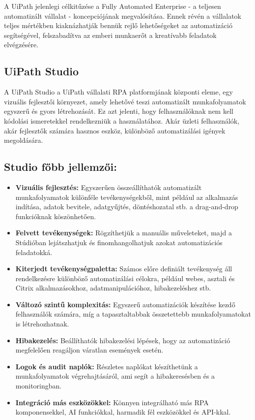 \documentclass[
]{thesis-ekf}
\theoremstyle{definition}
\theoremstyle{remark}
\begin{document}
A UiPath jelenlegi célkitűzése a Fully Automated Enterprise - a teljesen automatizált vállalat - koncepciójának megvalósítása. Ennek révén a vállalatok teljes mértékben kiaknázhatják bennük rejlő lehetőségeket az automatizáció segítségével, felszabadítva az emberi munkaerőt a kreatívabb feladatok elvégzésére.

\subsection{ UiPath Studio}
A UiPath Studio a UiPath vállalati RPA platformjának központi eleme, egy vizuális fejlesztői környezet, amely lehetővé teszi automatizált munkafolyamatok egyszerű és gyors létrehozását. Ez azt jelenti, hogy felhasználóknak nem kell kódolási ismeretekkel rendelkezniük a használatához. Akár üzleti felhasználók, akár fejlesztők számára hasznos eszköz, különböző automatizálási igények megoldására.
\subsection*{Studio főbb jellemzői:}
	\begin{itemize}
		\item \textbf{Vizuális fejlesztés:} Egyszerűen összeállíthatók automatizált munkafolyamatok különféle tevékenységekből, mint például az alkalmazás indítása, adatok bevitele, adatgyűjtés, döntéshozatal stb. a drag-and-drop funkcióknak köszönhetően.
		
		\item \textbf{Felvett tevékenységek:} Rögzíthetjük a manuális műveleteket, majd a Stúdióban lejátszhatjuk és finomhangolhatjuk azokat automatizációs feladatokká.
				
		\item \textbf{Kiterjedt tevékenységpaletta:} Számos előre definiált tevékenység áll rendelkezésre különböző automatizálási célokra, például webes, asztali és Citrix alkalmazásokhoz, adatmanipulációhoz, hibakezeléshez stb.
		
		
		\item \textbf{Változó szintű komplexitás:} Egyszerű automatizációk készítése kezdő felhasználók számára, míg a tapasztaltabbak összetettebb munkafolyamatokat is létrehozhatnak.
		
		\item \textbf{Hibakezelés:} Beállíthatók hibakezelési lépések, hogy az automatizáció megfelelően reagáljon váratlan események esetén.
		
		\item \textbf{Logok és audit naplók:} Részletes naplókat készíthetünk a munkafolyamatok végrehajtásáról, ami segít a hibakeresésben és a monitoringban.
		
		\item \textbf{Integráció más eszközökkel:} Könnyen integrálható más RPA komponensekkel, AI funkciókkal, harmadik fél eszközökkel és API-kkal.
		
	\end{itemize}
\end{document}
